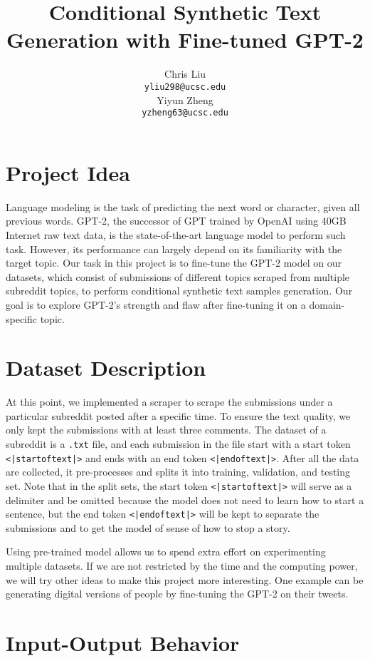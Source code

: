 \documentclass[10pt]{article}
\title{Conditional Synthetic Text Generation with Fine-tuned GPT-2}
\author{
 Chris Liu \\
    \texttt{yliu298@ucsc.edu} \\
 \And
 Yiyun Zheng \\
    \texttt{yzheng63@ucsc.edu}
}
\date{}
\begin{document}
\maketitle
\section{Project Idea}

Language modeling is the task of predicting the next word or character, given all previous words. GPT-2, the successor of GPT \cite{radford2018improving} trained by OpenAI \cite{radford2019language} using 40GB Internet raw text data, is the state-of-the-art language model to perform such task. However, its performance can largely depend on its familiarity with the target topic. Our task in this project is to fine-tune the GPT-2 model on our datasets, which consist of submissions of different topics scraped from multiple subreddit topics, to perform conditional synthetic text samples generation. Our goal is to explore GPT-2's strength and flaw after fine-tuning it on a domain-specific topic.

\section{Dataset Description}

At this point, we implemented a scraper to scrape the submissions under a particular subreddit posted after a specific time. To ensure the text quality, we only kept the submissions with at least three comments. The dataset of a subreddit is a \texttt{.txt} file, and each submission in the file start with a start token \texttt{<|startoftext|>} and ends with an end token \texttt{<|endoftext|>}. After all the data are collected, it pre-processes and splits it into training, validation, and testing set. Note that in the split sets, the start token \texttt{<|startoftext|>} will serve as a delimiter and be omitted because the model does not need to learn how to start a sentence, but the end token \texttt{<|endoftext|>} will be kept to separate the submissions and to get the model of sense of how to stop a story.

Using pre-trained model allows us to spend extra effort on experimenting multiple datasets. If we are not restricted by the time and the computing power, we will try other ideas to make this project more interesting. One example can be generating digital versions of people by fine-tuning the GPT-2 on their tweets.

\section{Input-Output Behavior}
\end{document}
